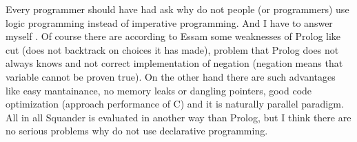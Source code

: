 \documentclass[11pt,twoside,a4paper]{book}
\begin{document}
Every programmer should have had ask why do not people (or programmers)
use logic programming instead of imperative programming. And I have to answer
myself . Of course there are according to Essam
\cite{essam:cla} some weaknesses of Prolog like cut (does not backtrack on
choices it has made), problem that Prolog does not always knows 
and not correct implementation of negation (negation means that variable cannot
be proven true). On the other hand there are such advantages like easy mantainance,
no memory leaks or dangling pointers, good code optimization (approach
performance of C) and it is naturally parallel paradigm. All in all Squander is
evaluated in another way than Prolog, but I think there are no serious problems
why do not use declarative programming.


\end{document}
